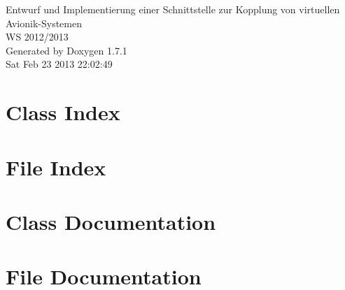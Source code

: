 \documentclass[a4paper]{book}
\begin{document}
\hypersetup{pageanchor=false}
\begin{titlepage}
\vspace*{7cm}
\begin{center}
{\Large Entwurf und Implementierung einer Schnittstelle zur Kopplung von virtuellen Avionik-\/Systemen \\[1ex]\large WS 2012/2013 }\\
\vspace*{1cm}
{\large Generated by Doxygen 1.7.1}\\
\vspace*{0.5cm}
{\small Sat Feb 23 2013 22:02:49}\\
\end{center}
\end{titlepage}
\clearemptydoublepage
{}
\tableofcontents
\clearemptydoublepage
{}
\hypersetup{pageanchor=true}
\chapter{Class Index}

\chapter{File Index}

\chapter{Class Documentation}


\chapter{File Documentation}





\printindex
\end{document}

